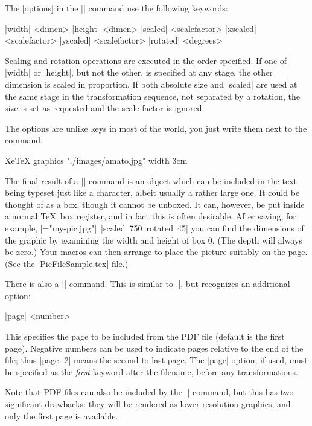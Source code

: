 The [options] in the |\XeTeXpicfile| command use the following keywords:{\obeylines \parskip0pt \parindent
  |width| <dimen>
  |height| <dimen>
  |scaled| <scalefactor>
  |xscaled| <scalefactor>
  |yscaled| <scalefactor>
  |rotated| <degrees>\par}\noindent
Scaling and rotation operations are executed in the order specified. If one of |width| or |height|, but not the other, is specified at any stage, the other dimension is scaled in proportion. If both absolute size and |scaled| are used at the same stage in the transformation sequence, not separated by a rotation, the size is set as requested and the scale factor is ignored.

The options are unlike keys in most of the \latexe world, you just write them next to the command.

\begin{texexample}{XeTeX graphics}{}
\XeTeXpicfile "./images/amato.jpg" width 3cm
\end{texexample}

The final result of a |\XeTeXpicfile| command is an object which can be included in the text being typeset just like a character, albeit usually a rather large one. It could be thought of as a box, though it cannot be unboxed. It can, however, be put inside a normal \TeX\ box register, and in fact this is often desirable. After saying, for example,\hfil\break
\indent\indent |=\hbox{\XeTeXpicfile "my-pic.jpg"|\hfil\break
\indent\indent\indent\indent |scaled 750 rotated 45}|\hfil\break
you can find the dimensions of the graphic by examining the width and height of box 0. (The depth will always be zero.) Your macros can then arrange to place the picture suitably on the page. (See the |PicFileSample.tex| file.)



There is also a |\XeTeXpdffile| command. This is similar to |\XeTeXpicfile|, but recognizes an additional option:{\obeylines\parskip0pt\parindent
	|page| <number>\par}\noindent
This specifies the page to be included from the PDF file (default is the first page). Negative numbers can be used to indicate pages relative to the end of the file; thus |page -2| means the second to last page. The |page| option, if used, must be specified as the {\em first} keyword after the filename, before any transformations.

Note that PDF files can also be included by the |\XeTeXpicfile| command, but this has two significant drawbacks: they will be rendered as lower-resolution graphics, and only the first page is available.

